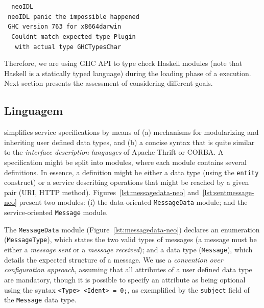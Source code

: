\begin{tabbing}\tt
~neoIDL\\
\tt ~neoIDL~panic~the~impossible~happened\\
\tt ~GHC~version~763~for~x8664darwin\\
\tt ~~Couldnt~match~expected~type~Plugin\\
\tt ~~~with~actual~type~GHCTypesChar
\end{tabbing}

Therefore, we are using GHC API to type check Haskell modules (note that Haskell is a statically typed language) during
the loading phase of a \neoidl{} execution. Next section presents the assessment of \neoidl{} considering different 
goals. 


\subsection{Linguagem}
\vspace{-6mm}


\neoidl{} simplifies service specifications by means of 
(a) mechanisms for modularizing and inheriting user defined data 
types, and (b) a concise syntax that is quite similar to the 
\emph{interface description languages} of Apache Thrift or CORBA. A 
\neoidl{} specification might be split into modules, where each
module contains several definitions. In essence, a \neoidl{} definition might be either a 
data type (using the \texttt{entity} construct) or a service describing
operations that might be reached by a given pair (URI, HTTP
method). Figures~\ref{lst:messagedata-neo}
and~\ref{lst:sentmessage-neo} present two \neoidl{} modules:
(i) the data-oriented \texttt{MessageData} module;
and the service-oriented \texttt{Message} module.

The \texttt{MessageData} module (Figure~\ref{lst:messagedata-neo})
declares an enumeration
(\texttt{MessageType}), which states the two valid types of
messages (a message must be either a \emph{message sent} or
a \emph{message received}); and a data type (\texttt{Message}),
which details the expected structure of a
message. We use a \emph{convention over configuration approach}, 
assuming that all attributes of a user defined data type are
mandatory, though it is possible to specify an attribute as being optional  
using the syntax \texttt{<Type> <Ident> = 0;}, as exemplified by
the \texttt{subject} field of the \texttt{Message} data type.

